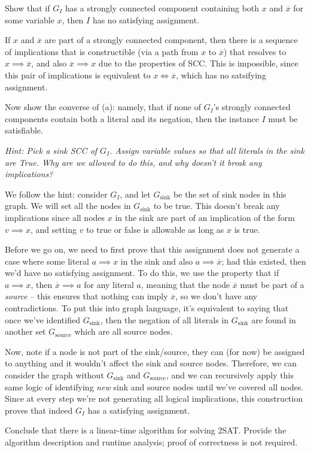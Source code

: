 \documentclass[10.5pt]{article}
\begin{document}
\begin{subparts}
\item Show that if $G_I$ has a strongly connected component containing both $x$ and $\overline x$ for some
variable $x$, then $I$ has no satisfying assignment.

\begin{solution}
	If $x$ and $\overline x$ are part of a strongly connected component, then there is a sequence 
	of implications that is constructible (via a path from $x$ to $\overline x$) that resolves to 
	$x \implies \overline x$, and also $\overline x \implies x$ due to the properties of SCC. 
	This is impossible, since this pair of implications is equivalent to $x \iff \overline x$, which has 
	no satsifying assignment.
\end{solution}
\item Now show the converse of (a): namely, that if none of $G_I$'s strongly connected components
contain both a literal and its negation, then the instance $I$ must be satisfiable. 

\emph{Hint: Pick a sink SCC of $G_I$. Assign variable values so that all literals in the sink are True. Why are we allowed to do this, and why doesn't it break any implications?}

\begin{solution}
	We follow the hint: consider $G_I$, and let $G_{\text{sink}}$ be the set of sink nodes in this graph. 
	We will set all the nodes in $G_{\text{sink}}$ to be true. This 
	doesn't break any implications since all nodes $x$ in the sink are part of an implication of the 
	form $v \implies x$, and setting $v$ to true or false is allowable as long as $x$ is true. 
	
	Before we go on, we need to first prove that this assignment does not generate a case where 
	some literal $a \implies x$ in the sink and also $a \implies \overline x$; had this existed, 
	then we'd have no satisfying assignment. To do this, we use the 
	property that if $a \implies x$, then $\overline x \implies a$ for any literal $a$, meaning that 
	the node $\overline x$ must be part of a \textit{source} -- this ensures that nothing can imply 
	$\overline x$, so we don't have any contradictions. To put this into graph language, it's equivalent 
	to saying that once we've identified
	$G_{\text{sink}}$, then the negation of all literals in $G_{\text{sink}}$ are found in another 
	set $G_{\text{source}}$ which are all source nodes. 

	Now, note if a node is not part of the sink/source, they can (for now) be assigned to anything and it 
	wouldn't affect the sink and source nodes. Therefore, we can consider the graph without 
	$G_{\text{sink}}$ and $G_{\text{source}}$, and we can recursively apply this same logic of identifying 
	\textit{new} sink and source nodes until we've covered all nodes. Since at every step 
	we're not generating all logical implications, this construction proves that indeed $G_I$ has a 
	satisfying assignment.
\end{solution}
\item Conclude that there is a linear-time algorithm for solving 2SAT. Provide the algorithm description and runtime analysis; proof of correctness is not required.


\end{subparts}
\end{document}

